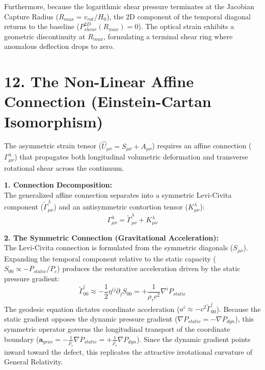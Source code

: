 Furthermore, because the logarithmic shear pressure terminates at the Jacobian Capture Radius ($R_{max} = v_{rot}/H_0$), the 2D component of the temporal diagonal returns to the baseline ($P_{shear}^{2D}(R_{max}) = 0$). The optical strain exhibits a geometric discontinuity at $R_{max}$, formulating a terminal shear ring where anomalous deflection drops to zero. 





\section*{12. The Non-Linear Affine Connection (Einstein-Cartan Isomorphism)}

The asymmetric strain tensor ($\hat{U}_{\mu\nu} = S_{\mu\nu} + A_{\mu\nu}$) requires an affine connection ($\Gamma^\lambda_{\mu\nu}$) that propagates both longitudinal volumetric deformation and transverse rotational shear across the continuum.

\textbf{1. Connection Decomposition:} \\
The generalized affine connection separates into a symmetric Levi-Civita component ($\tilde{\Gamma}^\lambda_{\mu\nu}$) and an antisymmetric contortion tensor ($K^\lambda_{\mu\nu}$):
\begin{equation}
    \Gamma^\lambda_{\mu\nu} = \tilde{\Gamma}^\lambda_{\mu\nu} + K^\lambda_{\mu\nu}
\end{equation}

\textbf{2. The Symmetric Connection (Gravitational Acceleration):} \\
The Levi-Civita connection is formulated from the symmetric diagonals ($S_{\mu\nu}$). Expanding the temporal component relative to the static capacity ($S_{00} \propto -P_{static}/P_c$) produces the restorative acceleration driven by the static pressure gradient: 
\begin{equation}
    \tilde{\Gamma}^i_{00} \approx -\frac{1}{2} \eta^{ij} \partial_j S_{00} = +\frac{1}{\rho_\tau c^2} \nabla^i P_{static} 
\end{equation}
The geodesic equation dictates coordinate acceleration ($a^i \approx -c^2 \tilde{\Gamma}^i_{00}$). Because the static gradient opposes the dynamic pressure gradient ($\nabla P_{static} = -\nabla P_{dyn}$), this symmetric operator governs the longitudinal transport of the coordinate boundary ($\mathbf{a}_{grav} = -\frac{1}{\rho_\tau} \nabla P_{static} = +\frac{1}{\rho_\tau} \nabla P_{dyn}$). Since the dynamic gradient points inward toward the defect, this replicates the attractive irrotational curvature of General Relativity. 


